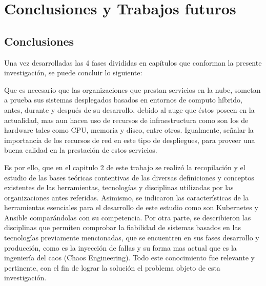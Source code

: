 \chapter{Conclusiones y Trabajos futuros}

\section{Conclusiones}

\par Una vez desarrolladas las 4 fases divididas en capítulos que conforman la presente investigación, se puede concluir lo siguiente:\\
\par Que es necesario que las organizaciones que prestan servicios en la nube, sometan a prueba sus sistemas desplegados basados en entornos de computo híbrido, antes, durante y después de su desarrollo, debido al auge que \'estos poseen en la actualidad, mas aun hacen uso de recursos de infraestructura como son los de hardware tales como CPU, memoria y disco, entre otros. Igualmente, señalar la importancia de los recursos de red en este tipo de despliegues, para proveer una buena calidad en la prestación de estos servicios. \\

\par Es por ello, que en el capitulo 2 de este trabajo se realiz\'o la recopilación y el estudio de las bases teóricas contentivas de las diversas definiciones y conceptos existentes de las herramientas, tecnologías y disciplinas utilizadas por las organizaciones antes referidas. Asimismo, se indicaron las características de la herramientas esenciales para el desarrollo de este estudio como son Kubernetes y Ansible comparándolas con su competencia. Por otra parte, se describieron las disciplinas que permiten comprobar la fiabilidad de sistemas basados en las tecnologías previamente mencionadas, que se encuentren en sus fases desarrollo y producción, como es la inyección de fallas y su forma mas actual que es la ingeniería del caos (Chaos Engineering). Todo este conocimiento fue relevante y pertinente, con el fin de lograr la solución el problema objeto de esta investigación. \\

